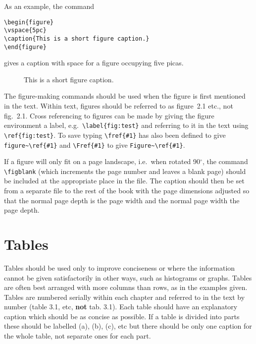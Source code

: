 As an example, the command
\begin{verbatim}
\begin{figure}
\vspace{5pc}
\caption{This is a short figure caption.} 
\end{figure}
\end{verbatim}
gives a caption with space for a figure occupying five picas.
\begin{figure}
\vspace{5pc}
\caption{This is a short figure caption.}
\end{figure}


The figure-making commands should be used when the figure is first 
mentioned in the text. Within text, figures should be referred to as 
figure~2.1 etc., not fig.~2.1. Cross referencing to figures can be made by
giving the figure environment a label, e.g.\ \verb"\label{fig:test}" and
referring to it in the text using \verb"\ref{fig:test}". To save typing
\verb"\fref{#1}" has also 
been defined to give \verb"figure~\ref{#1}" and \verb"\Fref{#1}" to give
\verb"Figure~\ref{#1}".

If a figure will only fit on a page 
landscape, 
i.e.\ when rotated 90$^\circ$, 
the command \verb"\figblank" (which increments the page 
number and leaves a blank page) should be included at the appropriate 
place in the file. The caption should then be 
set from a separate file to the rest of the book
with the page dimensions adjusted so that the normal 
page depth is the page width and the normal page width the page depth.  



\section{Tables\label{tabsec}}
Tables should be used only to improve conciseness or where the 
information cannot be given satisfactorily in other ways, such as 
histograms or graphs. Tables are often 
best arranged with more columns than rows, as in the examples given.
Tables are numbered serially within each chapter 
and referred to in the text 
by number (table 3.1, etc, {\bf not} tab. 3.1). Each table should have an 
explanatory caption which should be as concise as possible. If a table 
is divided into parts these should be labelled \pt(a), \pt(b), 
\pt(c), etc but there should be only one caption for the whole 
table, not separate ones for each part.


